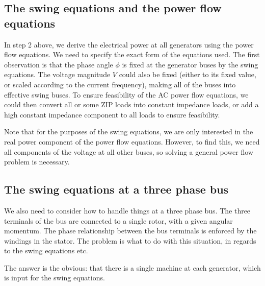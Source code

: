 \documentclass[10pt]{article}
\begin{document}
\subsection{The swing equations and the power flow equations}
In step 2 above, we derive the electrical power at all generators using the power flow equations. We need to specify the exact form of the equations used. The first observation is that the phase angle $\phi$ is fixed at the generator buses by the swing equations. The voltage magnitude $V$ could also be fixed (either to its fixed value, or scaled according to the current frequency), making all of the buses into effective swing buses. To ensure feasibility of the AC power flow equations, we could then convert all or some ZIP loads into constant impedance loads, or add a high constant impedance component to all loads to ensure feasibility.

Note that for the purposes of the swing equations, we are only interested in the real power component of the power flow equations. However, to find this, we need all components of the voltage at all other buses, so solving a general power flow problem is necessary.

\subsection{The swing equations at a three phase bus}
We also need to consider how to handle things at a three phase bus. The three terminals of the bus are connected to a single rotor, with a given angular momentum. The phase relationship between the bus terminals is enforced by the windings in the stator. The problem is what to do with this situation, in regards to the swing equations etc.

The answer is the obvious: that there is a single machine at each generator, which is input for the swing equations. 
\end{document}
